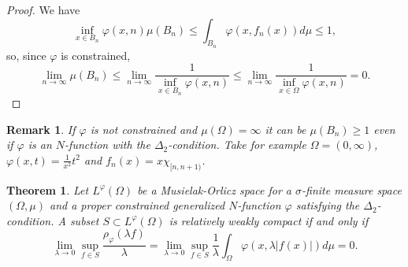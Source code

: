 \documentclass[11pt,a4paper]{amsart}
\newtheorem{teorema}[definicion]{Theorem}
\newtheorem{nota}[definicion]{Remark}
\newcommand{\lphi}{{L^{\varphi}(\Omega)}}
\begin{document}
\begin{proof}
    We have
    $$\inf_{x\in B_n}\varphi(x,n)\mu(B_n)
    \leq \int_{B_n} \varphi(x, f_n(x))d\mu\leq 1,
    $$
    so, since $\varphi$ is constrained,
    $$\lim_{n\rightarrow\infty}\mu(B_n)
    \leq \lim_{n\rightarrow\infty}\frac{1}{\inf_{x\in B_n}\varphi (x,n)}
    \leq \lim_{n\rightarrow\infty}\frac{1}{\inf_{x\in \Omega}\varphi (x,n)}= 0.
    $$
\end{proof}

\begin{nota}
    If $\varphi$ is not constrained and $\mu(\Omega)=\infty$ it can be $\mu(B_n)\geq 1$ even if $\varphi$ is an $N$-function with the $\Delta_2$-condition. Take for example $\Omega=(0,\infty)$, $\varphi(x,t)=\frac{1}{x^2}t^{2}$ and $f_n(x)=x\chi_{[n,n+1)}$.
\end{nota}



\begin{teorema}\label{crit2}
Let $\lphi$ be a Musielak-Orlicz space for a $\sigma$-finite measure space $(\Omega,\mu)$ and a proper constrained generalized $N$-function $\varphi$ satisfying the $\Delta_2$-condition. A subset $S\subset \lphi$ is relatively weakly compact if and only if
\begin{equation}\label{condicion}
\lim_{\lambda\rightarrow 0} \sup_{f\in S} \frac{\rho_{\varphi}(\lambda f)}{\lambda}
=\lim_{\lambda\rightarrow 0} \sup_{f\in S} \frac{1}{\lambda}\int_{\Omega} \varphi(x,\lambda \vert f(x)\vert) d\mu=0.
\end{equation}
\end{teorema}
\end{document}
